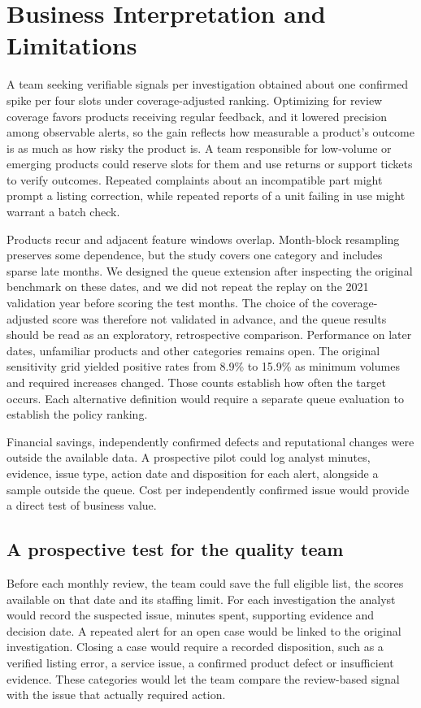 \documentclass[conference]{IEEEtran}
\begin{document}
\section{Business Interpretation and Limitations}
A team seeking verifiable signals per investigation obtained about one confirmed spike per four slots under coverage-adjusted ranking. Optimizing for review coverage favors products receiving regular feedback, and it lowered precision among observable alerts, so the gain reflects how measurable a product's outcome is as much as how risky the product is. A team responsible for low-volume or emerging products could reserve slots for them and use returns or support tickets to verify outcomes. Repeated complaints about an incompatible part might prompt a listing correction, while repeated reports of a unit failing in use might warrant a batch check.

Products recur and adjacent feature windows overlap. Month-block resampling preserves some dependence, but the study covers one category and includes sparse late months. We designed the queue extension after inspecting the original benchmark on these dates, and we did not repeat the replay on the 2021 validation year before scoring the test months. The choice of the coverage-adjusted score was therefore not validated in advance, and the queue results should be read as an exploratory, retrospective comparison. Performance on later dates, unfamiliar products and other categories remains open. The original sensitivity grid yielded positive rates from 8.9\% to 15.9\% as minimum volumes and required increases changed. Those counts establish how often the target occurs. Each alternative definition would require a separate queue evaluation to establish the policy ranking.

Financial savings, independently confirmed defects and reputational changes were outside the available data. A prospective pilot could log analyst minutes, evidence, issue type, action date and disposition for each alert, alongside a sample outside the queue. Cost per independently confirmed issue would provide a direct test of business value.

\subsection{A prospective test for the quality team}
Before each monthly review, the team could save the full eligible list, the scores available on that date and its staffing limit. For each investigation the analyst would record the suspected issue, minutes spent, supporting evidence and decision date. A repeated alert for an open case would be linked to the original investigation. Closing a case would require a recorded disposition, such as a verified listing error, a service issue, a confirmed product defect or insufficient evidence. These categories would let the team compare the review-based signal with the issue that actually required action.
\end{document}

